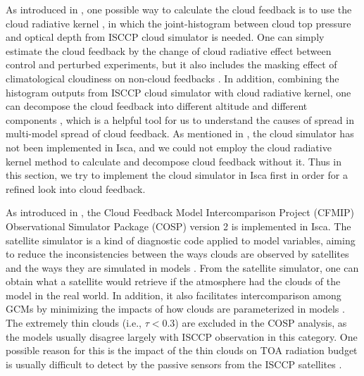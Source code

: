 As introduced in , one possible way to calculate the cloud feedback is to use the cloud radiative kernel \citep{Zelinka2012computing1,Zelinka2012computing2}, in which the joint-histogram between cloud top pressure and optical depth from ISCCP cloud simulator \citep{Klein1999validation,Webb2001combining} is needed. One can simply estimate the cloud feedback by the change of cloud radiative effect between control and perturbed experiments, but it also includes the masking effect of climatological cloudiness on non-cloud feedbacks \citep{Soden2004}. In addition, combining the histogram outputs from ISCCP cloud simulator with cloud radiative kernel, one can decompose the cloud feedback into  different altitude and different components \citep{Zelinka2012computing2,Zelinka2016insights}, which is a helpful tool for us to understand the causes of spread in multi-model spread of cloud feedback. As mentioned in , the cloud simulator has not been implemented in Isca, and we could not employ the cloud radiative kernel method to calculate and decompose cloud feedback without it. Thus in this section, we try to implement the cloud simulator in Isca first in order for a refined look into cloud feedback.

As introduced in , the Cloud Feedback Model Intercomparison Project (CFMIP) Observational Simulator Package (COSP) version 2 \citep{Swales2018} is implemented in Isca. The satellite simulator is a kind of diagnostic code applied to model variables, aiming to reduce the inconsistencies between the ways clouds are observed by satellites and the ways they are simulated in models \citep{BodasSalcedo2011}. From the satellite simulator, one can obtain what a satellite would retrieve if the atmosphere had the clouds of the model in the real world. In addition, it also facilitates intercomparison among GCMs by minimizing the impacts of how clouds are parameterized in models \citep[e.g.][]{Klein2013climate}. The extremely thin clouds (i.e., $\tau<$0.3) are excluded in the COSP analysis, as the models usually disagree largely with ISCCP observation in this category. One possible reason for this is the impact of the thin clouds on TOA radiation budget is usually difficult to detect by the passive sensors from the ISCCP satellites \citep{Klein2013climate}.

